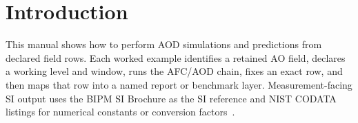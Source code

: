 \section{Introduction}
\label{man:introduction}

This manual shows how to perform AOD simulations and predictions from declared field rows. Each worked example identifies a retained AO field, declares a working level and window, runs the AFC/AOD chain, fixes an exact row, and then maps that row into a named report or benchmark layer. Measurement-facing SI output uses the BIPM SI Brochure as the SI reference and NIST CODATA listings for numerical constants or conversion factors~\cite{bipm_si_brochure_2025,nist_constants_complete}.

